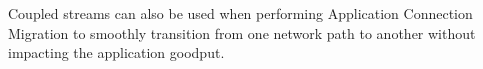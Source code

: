 Coupled streams can also be used when performing Application Connection
Migration to smoothly transition from one network path to another without
impacting the application goodput.





